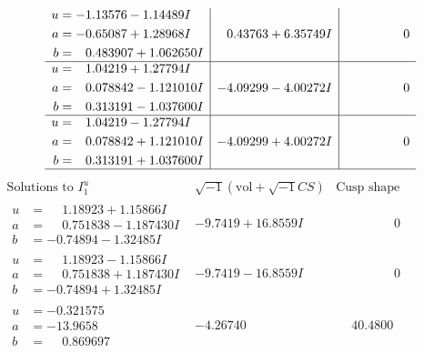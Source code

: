 \documentclass[1p]{elsarticle_modified}
\theoremstyle{definition}
\newcommand{\I}{\sqrt{-1}}
\begin{document}
$$\begin{array}{c|c|c}
\begin{aligned}
u &= -1.13576 - 1.14489 I \\
a &= -0.65087 + 1.28968 I \\
b &= \phantom{-}0.483907 + 1.062650 I\end{aligned}
 & \phantom{-}0.43763 + 6.35749 I & \phantom{-0.000000 } 0 \\ \hline\begin{aligned}
u &= \phantom{-}1.04219 + 1.27794 I \\
a &= \phantom{-}0.078842 - 1.121010 I \\
b &= \phantom{-}0.313191 - 1.037600 I\end{aligned}
 & -4.09299 - 4.00272 I & \phantom{-0.000000 } 0 \\ \hline\begin{aligned}
u &= \phantom{-}1.04219 - 1.27794 I \\
a &= \phantom{-}0.078842 + 1.121010 I \\
b &= \phantom{-}0.313191 + 1.037600 I\end{aligned}
 & -4.09299 + 4.00272 I & \phantom{-0.000000 } 0\\
 \hline 
 \end{array}$$\newpage$$\begin{array}{c|c|c}  
\text{Solutions to }I^u_{1}& \I (\text{vol} + \sqrt{-1}CS) & \text{Cusp shape}\\
 \hline 
\begin{aligned}
u &= \phantom{-}1.18923 + 1.15866 I \\
a &= \phantom{-}0.751838 - 1.187430 I \\
b &= -0.74894 - 1.32485 I\end{aligned}
 & -9.7419 + 16.8559 I & \phantom{-0.000000 } 0 \\ \hline\begin{aligned}
u &= \phantom{-}1.18923 - 1.15866 I \\
a &= \phantom{-}0.751838 + 1.187430 I \\
b &= -0.74894 + 1.32485 I\end{aligned}
 & -9.7419 - 16.8559 I & \phantom{-0.000000 } 0 \\ \hline\begin{aligned}
u &= -0.321575\phantom{ +0.000000I} \\
a &= -13.9658\phantom{ +0.000000I} \\
b &= \phantom{-}0.869697\phantom{ +0.000000I}\end{aligned}
 & -4.26740\phantom{ +0.000000I} & \phantom{-}40.4800\phantom{ +0.000000I} \\ \hline\begin{aligned}

\end{aligned}
\end{array}$$
\end{document}
